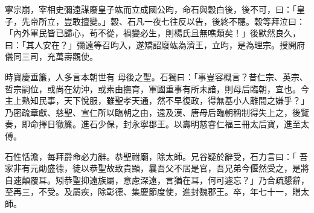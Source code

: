 \begin{pinyinscope}
 寧宗崩，宰相史彌遠謀廢皇子竑而立成國公昀，命石與穀白後，後不可，曰：「皇子，先帝所立，豈敢擅變。」穀、石凡一夜七往反以告，後終不聽。穀等拜泣曰：「內外軍民皆已歸心，茍不從，禍變必生，則楊氏且無噍類矣！」後默然良久，曰：「其人安在？」彌遠等召昀入，遂矯詔廢竑為濟王，立昀，是為理宗。授開府儀同三司，充萬壽觀使。



 時寶慶垂簾，人多言本朝世有
 母後之聖。石獨曰：「事豈容概言？昔仁宗、英宗、哲宗嗣位，或尚在幼沖，或素由撫育，軍國重事有所未諳，則母后臨朝，宜也。今主上熟知民事，天下悅服，雖聖孝天通，然不早復政，得無基小人離間之嫌乎？」乃密疏章獻、慈聖、宣仁所以臨朝之由，遠及漢、唐母后臨朝稱制得失上之，後覽奏，即命擇日徹簾。進石少保，封永寧郡王。以壽明慈睿仁福三冊太后寶，進至太傅。



 石性恬澹，每拜爵命必力辭。恭聖祔廟，除太師。兄谷疑於辭受，石力言曰：「
 吾家非有元勛盛德，徒以恭聖故致貴顯，曩吾父不居是官，吾兄弟今偃然受之，是將自速顛覆耳。矧恭聖抑遠族屬，意慮深遠，言猶在耳，何可遽忘？」乃合疏懇辭，至再三，不受。及屬疾，除彰德、集慶節度使，進封魏郡王。卒，年七十一，贈太師。



\end{pinyinscope}